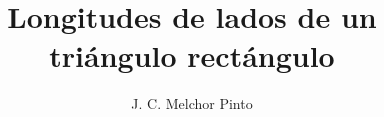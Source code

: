 \documentclass[12pt]{guia}
\title{Longitudes de lados de un triángulo rectángulo}
\author{J. C. Melchor Pinto}
\begin{document}
\pagestyle{headandfoot}
\addpoints
\INFO
\begin{multicols}{2}
    
    
    \columnbreak
    
\end{multicols}
\begin{questions}
    \questionboxed[10]{}
    \questionboxed[10]{}
    \questionboxed[10]{}
    \questionboxed[10]{}
    \questionboxed[10]{}
    \questionboxed[10]{}
    \questionboxed[10]{}
    \questionboxed[10]{}
    \questionboxed[10]{}
    \questionboxed[10]{}
\end{questions}
\end{document}
